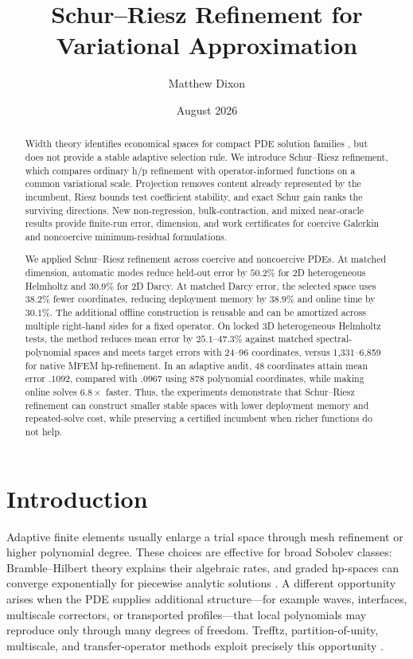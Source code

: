 \documentclass[11pt]{article}
\title{Schur--Riesz Refinement for Variational Approximation}
\author{Matthew Dixon}
\date{August 2026}
\numberwithin{algorithm}{section}
\theoremstyle{definition}\newtheorem{definition}[theorem]{Definition}
\theoremstyle{remark}\newtheorem{remark}[theorem]{Remark}
\begin{document}
\maketitle

\begin{abstract}
Width theory identifies economical spaces for compact PDE solution families
\cite{kolmogorov1936,babuskalipton2011}, but does not provide a stable adaptive
selection rule.  We introduce Schur--Riesz refinement, which compares ordinary
h/p refinement with operator-informed functions on a common variational scale.
Projection removes content already represented by the incumbent, Riesz bounds
test coefficient stability, and exact Schur gain ranks the surviving
directions.  New non-regression, bulk-contraction, and mixed near-oracle results
provide finite-run error, dimension, and work certificates for coercive
Galerkin and noncoercive minimum-residual formulations.

We applied Schur--Riesz refinement across coercive and noncoercive PDEs.  At
matched dimension, automatic modes reduce held-out error by
$50.2\%$ for 2D heterogeneous Helmholtz and $30.9\%$ for 2D Darcy.  At matched Darcy error, the selected space uses
$38.2\%$ fewer coordinates, reducing deployment memory by $38.9\%$ and online
time by $30.1\%$.  The additional offline construction is reusable and can be
amortized across multiple right-hand sides for a fixed operator.
On locked 3D heterogeneous Helmholtz tests, the method reduces mean error by
$25.1$--$47.3\%$ against matched spectral-polynomial spaces and meets target
errors with 24--96 coordinates, versus 1,331--6,859 for native MFEM
hp-refinement.  In an adaptive audit, 48 coordinates attain mean error
$.1092$, compared with $.0967$ using 878 polynomial coordinates, while making
online solves $6.8\times$ faster.
Thus, the experiments demonstrate that Schur--Riesz refinement can construct
smaller stable spaces with lower deployment memory and repeated-solve cost,
while preserving a certified incumbent when richer functions do not help.
\end{abstract}

\section{Introduction}
Adaptive finite elements usually enlarge a trial space through mesh refinement
or higher polynomial degree.  These choices are effective for broad Sobolev
classes: Bramble--Hilbert theory explains their algebraic rates, and graded
hp-spaces can converge exponentially for piecewise analytic solutions
\cite{ciarlet1978,schwab1998}.  A different opportunity arises when the PDE
supplies additional structure---for example waves, interfaces, multiscale
correctors, or transported profiles---that local polynomials may reproduce
only through many degrees of freedom.  Trefftz, partition-of-unity, multiscale,
and transfer-operator methods exploit precisely this opportunity
\cite{hiptmairmoiolaperugia2016,babuskamelenk1997,
efendievgalvishou2013,babuskalipton2011}.
\end{document}
